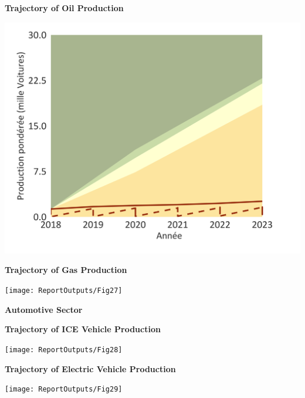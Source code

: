 \documentclass[10pt,table,a4]{article}\usepackage[]{graphicx}\usepackage[]{color}
\begin{document}
	\begin{minipage}[t]{.49\linewidth}
		\textbf{Trajectory of Oil Production }
		
		\includegraphics[trim = {0 0cm 0 0},width=1\linewidth]{ReportOutputs/Fig26}
		
	\end{minipage}	
	\hspace{.02\linewidth}
	\begin{minipage}[t]{.49\textwidth}
		\textbf{Trajectory of Gas Production }
		
		\texttt{[image: ReportOutputs/Fig27]}
		
	\end{minipage}
	
	
	\begin{center}
		\textbf{Automotive Sector}
	\end{center}
	
	\begin{minipage}[t]{.49\linewidth}
		\textbf{Trajectory of ICE Vehicle Production}
		
		\texttt{[image: ReportOutputs/Fig28]}
		
	\end{minipage}	
	\hspace{.02\linewidth}
	\begin{minipage}[t]{.49\textwidth}
		\textbf{Trajectory of Electric Vehicle Production}
		
		\texttt{[image: ReportOutputs/Fig29]}
		
	\end{minipage}		
	
\end{document}

